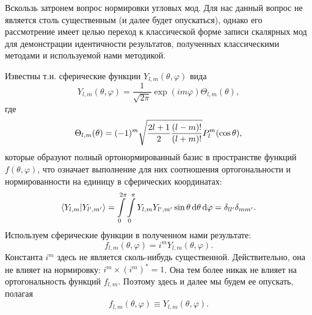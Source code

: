 \documentclass[12pt,a4paper]{article}
\begin{document}
        Вскользь затронем вопрос нормировки угловых мод. Для нас данный вопрос не является столь существенным (и далее будет опускаться), однако его рассмотрение имеет целью переход к классической форме записи скалярных мод для демонстрации идентичности результатов, полученных классическими методами и используемой нами методикой.

        Известны т.н. сферические функции $Y_{l,m}(\theta,\varphi)$ вида
        \begin{equation}
            Y_{l,m}(\theta,\varphi) = \frac{1}{\sqrt{2\pi}} \exp(im\varphi) \Theta_{l,m}(\theta) ,
        \end{equation}
        где
        \begin{equation}
            \Theta_{l,m}(\theta) = (-1)^m \sqrt{
                \frac{2l + 1}{2} \frac{(l-m)!}{(l+m)!}
            } P^m_l\qty(\cos\theta) ,
        \end{equation}
        которые образуют полный ортонормированный базис в пространстве функций $f(\theta,\varphi)$, что означает выполнение для них соотношения ортогональности и нормированности на единицу в сферических координатах:
        \begin{equation}
            \braket{Y_{l,m}}{Y_{l',m'}}
                = \int\limits_0^{2\pi} \int\limits_0^\pi {
                    Y_{l,m} Y_{l',m'} \sin\theta
                } \dd{\theta} \dd{\varphi}
                = \delta_{ll'} \delta_{mm'} .
        \end{equation}
        Используем сферические функции в полученном нами результате:
        \begin{equation}
            f_{l,m}(\theta,\varphi)
                = i^m Y_{l,m}(\theta,\varphi) .
        \end{equation}
        Константа $i^m$ здесь не является сколь-нибудь существенной. Действительно, она не влияет на нормировку: $i^m \times (i^m)^* = 1$. Она тем более никак не влияет на ортогональность функций $f_{l,m}$. Поэтому здесь и далее мы будем ее опускать, полагая
        \begin{equation}
            f_{l,m}(\theta,\varphi) \equiv Y_{l,m}(\theta,\varphi) .
        \end{equation}

\end{document}

